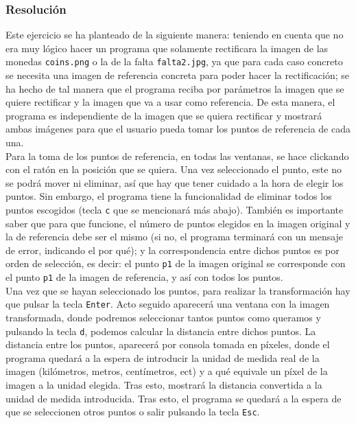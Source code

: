 \documentclass[a4paper,10pt,titlepage,oneside,openright]{book}
\begin{document}
\subsubsection*{Resolución}
Este ejercicio se ha planteado de la siguiente manera: teniendo en cuenta que no era muy lógico hacer un programa que solamente rectificara la imagen de las monedas \texttt{coins.png} o la de la falta \texttt{falta2.jpg}, ya que para cada caso concreto se necesita una imagen de referencia concreta para poder hacer la rectificación; se ha hecho de tal manera que el programa reciba por parámetros la imagen que se quiere rectificar y la imagen que va a usar como referencia. De esta manera, el programa es independiente de la imagen que se quiera rectificar y mostrará ambas imágenes para que el usuario pueda tomar los puntos de referencia de cada una. \\

Para la toma de los puntos de referencia, en todas las ventanas, se hace clickando con el ratón en la posición que se quiera. Una vez seleccionado el punto, este no se podrá mover ni eliminar, así que hay que tener cuidado a la hora de elegir los puntos. Sin embargo, el programa tiene la funcionalidad de eliminar todos los puntos escogidos (tecla \texttt{c} que se mencionará más abajo). También es importante saber que para que funcione, el número de puntos elegidos en la imagen original y la de referencia debe ser el mismo (si no, el programa terminará con un mensaje de error, indicando el por qué); y la correspondencia entre dichos puntos es por orden de selección, es decir: el punto \texttt{p1} de la imagen original se corresponde con el punto \texttt{p1} de la imagen de referencia, y así con todos los puntos. \\

Una vez que se hayan seleccionado los puntos, para realizar la transformación hay que pulsar la tecla \texttt{Enter}. Acto seguido aparecerá una ventana con la imagen transformada, donde podremos seleccionar tantos puntos como queramos y pulsando la tecla \texttt{d}, podemos calcular la distancia entre dichos puntos. La distancia entre los puntos, aparecerá por consola tomada en píxeles, donde el programa quedará a la espera de introducir la unidad de medida real de la imagen (kilómetros, metros, centímetros, ect) y a qué equivale un píxel de la imagen a la unidad elegida. Tras esto, mostrará la distancia convertida a la unidad de medida introducida. Tras esto, el programa se quedará a la espera de que se seleccionen otros puntos o salir pulsando la tecla \texttt{Esc}. \\
\end{document}
